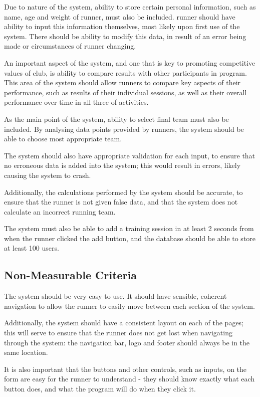 \documentclass{article}[12pt,a4paper]
\begin{document}
Due to nature of the system, ability to store certain personal information, such as name, age and weight of runner, must also be included. runner should have ability to input this information themselves, most likely upon first use of the system. There should be ability to modify this data, in result of an error being made or circumstances of runner changing.

An important aspect of the system, and one that is key to promoting competitive values of club, is ability to compare results with other participants in program. This area of the system should allow runners to compare key aspects of their performance, such as results of their individual sessions, as well as their overall performance over time in all three of activities.

As the main point of the system, ability to select final team must also be included. By analysing data points provided by runners, the system should be able to choose most appropriate team.

The system should also have appropriate validation for each input, to ensure that no erroneous data is added into the system; this would result in errors, likely causing the system to crash.

Additionally, the calculations performed by the system should be accurate, to ensure that the runner is not given false data, and that the system does not calculate an incorrect running team.

The system must also be able to add a training session in at least 2 seconds from when the runner clicked the add button, and the database should be able to store at least 100 users.

\subsection{Non-Measurable Criteria}
The system should be very easy to use. It should have sensible, coherent navigation to allow the runner to easily move between each section of the system. 

Additionally, the system should have a consistent layout on each of the pages; this will serve to ensure that the runner does not get lost when navigating through the system: the navigation bar, logo and footer should always be in the same location.

It is also important that the buttons and other controls, such as inputs, on the form are easy for the runner to understand - they should know exactly what each button does, and what the program will do when they click it. 
\end{document}

